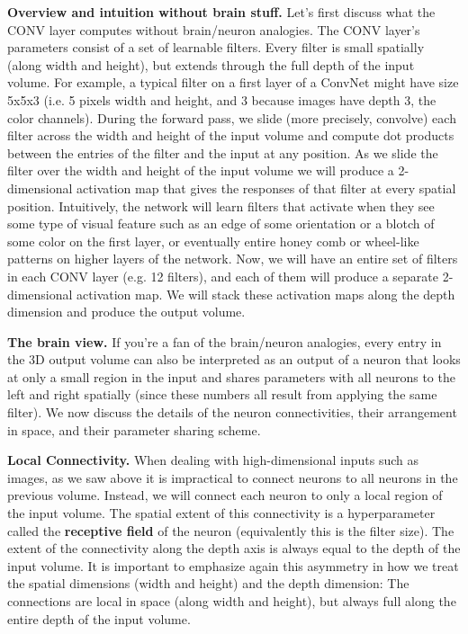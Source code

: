 \documentclass[fleqn,10pt]{olplainarticle}
\theoremstyle{definition}
\theoremstyle{remark}
\begin{document}
\textbf{Overview and intuition without brain stuff.} Let's first discuss what the CONV layer computes without brain/neuron analogies. The CONV layer's parameters consist of a set of learnable filters. Every filter is small spatially (along width and height), but extends through the full depth of the input volume. For example, a typical filter on a first layer of a ConvNet might have size 5x5x3 (i.e. 5 pixels width and height, and 3 because images have depth 3, the color channels). During the forward pass, we slide (more precisely, convolve) each filter across the width and height of the input volume and compute dot products between the entries of the filter and the input at any position. As we slide the filter over the width and height of the input volume we will produce a 2-dimensional activation map that gives the responses of that filter at every spatial position. Intuitively, the network will learn filters that activate when they see some type of visual feature such as an edge of some orientation or a blotch of some color on the first layer, or eventually entire honey comb or wheel-like patterns on higher layers of the network. Now, we will have an entire set of filters in each CONV layer (e.g. 12 filters), and each of them will produce a separate 2-dimensional activation map. We will stack these activation maps along the depth dimension and produce the output volume.\medskip

\textbf{The brain view.} If you're a fan of the brain/neuron analogies, every entry in the 3D output volume can also be interpreted as an output of a neuron that looks at only a small region in the input and shares parameters with all neurons to the left and right spatially (since these numbers all result from applying the same filter). We now discuss the details of the neuron connectivities, their arrangement in space, and their parameter sharing scheme.

\textbf{Local Connectivity.} When dealing with high-dimensional inputs such as images, as we saw above it is impractical to connect neurons to all neurons in the previous volume. Instead, we will connect each neuron to only a local region of the input volume. The spatial extent of this connectivity is a hyperparameter called the \textbf{receptive field} of the neuron (equivalently this is the filter size). The extent of the connectivity along the depth axis is always equal to the depth of the input volume. It is important to emphasize again this asymmetry in how we treat the spatial dimensions (width and height) and the depth dimension: The connections are local in space (along width and height), but always full along the entire depth of the input volume.
\end{document}
